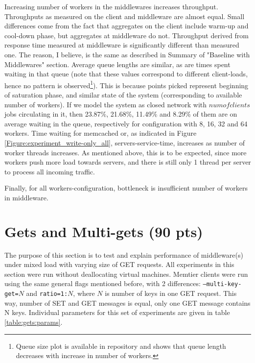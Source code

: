 \documentclass[11pt,a4paper]{article}
\begin{document}
Increasing number of workers in the middlewares increases throughput. Throughputs as measured on the client and middleware are almost equal. Small differences come from the fact that aggregates on the client include warm-up and cool-down phase, but aggregates at middleware do not. Throughput derived from response time measured at middleware is significantly different than measured one. The reason, I believe, is the same as described in Summary of "Baseline with Middlewares" section. Average queue lengths are similar, as are times spent waiting in that queue (note that these values correspond to different client-loads, hence no pattern is observed\footnote{Queue size plot is available in repository and shows that queue length decreases with increase in number of workers.}). This is because points picked represent beginning of saturation phase, and similar state of the system (corresponding to available number of workers). If we model the system as closed network with $num of clients$ jobs circulating in it, then 23.87\%, 21.68\%, 11.49\% and 8.29\% of them are on average waiting in the queue, respectively for configuration with 8, 16, 32 and 64 workers. Time waiting for memcached or, as indicated in Figure \ref{Figure:experiment_write-only_all}, servers-service-time, increases as number of worker threads increases. As mentioned above, this is to be expected, since more workers push more load towards servers, and there is still only 1 thread per server to process all incoming traffic.

Finally, for all workers-configuration, bottleneck is insufficient number of workers in middleware.


\section{Gets and Multi-gets (90 pts)}

The purpose of this section is to test and explain performance of middleware(s) under mixed load with varying size of GET requests. All experiments in this section were run without deallocating virtual machines. Memtier clients were run using the same general flags mentioned before, with 2 differences: \texttt{--multi-key-get=}$N$ and \texttt{ratio=1:}$N$, where $N$ is number of keys in one GET request. This way, number of SET and GET messages is equal, only one GET message contains N keys. Individual parameters for this set of experiments are given in table \ref{table:gets:params}.
\end{document}
